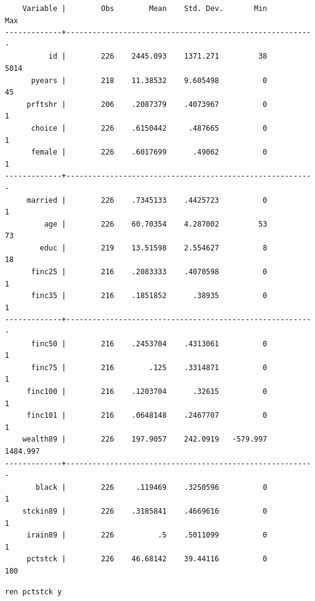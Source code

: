 \documentclass[]{book}
\begin{document}
\begin{verbatim}
    Variable |        Obs        Mean    Std. Dev.       Min        Max
-------------+---------------------------------------------------------
          id |        226    2445.093    1371.271         38       5014
      pyears |        218    11.38532    9.605498          0         45
     prftshr |        206    .2087379    .4073967          0          1
      choice |        226    .6150442     .487665          0          1
      female |        226    .6017699      .49062          0          1
-------------+---------------------------------------------------------
     married |        226    .7345133    .4425723          0          1
         age |        226    60.70354    4.287002         53         73
        educ |        219    13.51598    2.554627          8         18
      finc25 |        216    .2083333    .4070598          0          1
      finc35 |        216    .1851852      .38935          0          1
-------------+---------------------------------------------------------
      finc50 |        216    .2453704    .4313061          0          1
      finc75 |        216        .125    .3314871          0          1
     finc100 |        216    .1203704      .32615          0          1
     finc101 |        216    .0648148    .2467707          0          1
    wealth89 |        226    197.9057    242.0919   -579.997   1484.997
-------------+---------------------------------------------------------
       black |        226     .119469    .3250596          0          1
    stckin89 |        226    .3185841    .4669616          0          1
     irain89 |        226          .5    .5011099          0          1
     pctstck |        226    46.68142    39.44116          0        100
\end{verbatim}

\begin{verbatim}
ren pctstck y
\end{verbatim}
\end{document}
